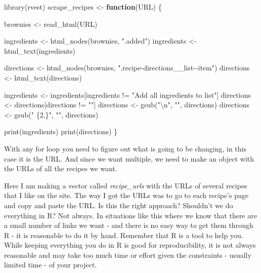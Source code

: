 \documentclass[
]{krantz}
\makeatletter
\newenvironment{Shaded}{\begin{snugshade}}{\end{snugshade}}
\newcommand{\ControlFlowTok}[1]{\textcolor[rgb]{0.27,0.27,0.27}{\textbf{#1}}}
\newcommand{\FunctionTok}[1]{\textcolor[rgb]{0,0,0}{#1}}
\newcommand{\NormalTok}[1]{#1}
\newcommand{\OtherTok}[1]{\textcolor[rgb]{0.37,0.37,0.37}{#1}}
\newcommand{\SpecialCharTok}[1]{\textcolor[rgb]{0,0,0}{#1}}
\newcommand{\StringTok}[1]{\textcolor[rgb]{0.5,0.5,0.5}{#1}}
\newenvironment{kframe}{%
\medskip{}
\setlength{\fboxsep}{.8em}
 \def\at@end@of@kframe{}%
 \ifinner\ifhmode%
  \def\at@end@of@kframe{\end{minipage}}%
  \begin{minipage}{\columnwidth}%
 \fi\fi%
 \def\FrameCommand##1{\hskip\@totalleftmargin \hskip-\fboxsep
 \colorbox{shadecolor}{##1}\hskip-\fboxsep
     \hskip-\linewidth \hskip-\@totalleftmargin \hskip\columnwidth}%
 \MakeFramed {\advance\hsize-\width
   \@totalleftmargin\z@ \linewidth\hsize
   \@setminipage}}%
 {\par\unskip\endMakeFramed%
 \at@end@of@kframe}
\renewenvironment{Shaded}{\begin{kframe}}{\end{kframe}}
\makeatother
\begin{document}
\begin{Shaded}
\begin{Highlighting}[]
\FunctionTok{library}\NormalTok{(rvest)}
\NormalTok{scrape\_recipes }\OtherTok{\textless{}{-}} \ControlFlowTok{function}\NormalTok{(URL) \{}
  
\NormalTok{  brownies }\OtherTok{\textless{}{-}} \FunctionTok{read\_html}\NormalTok{(URL)}
  
\NormalTok{  ingredients }\OtherTok{\textless{}{-}} \FunctionTok{html\_nodes}\NormalTok{(brownies, }\StringTok{".added"}\NormalTok{)}
\NormalTok{  ingredients }\OtherTok{\textless{}{-}} \FunctionTok{html\_text}\NormalTok{(ingredients)}
  
\NormalTok{  directions }\OtherTok{\textless{}{-}} \FunctionTok{html\_nodes}\NormalTok{(brownies, }\StringTok{".recipe{-}directions\_\_list{-}{-}item"}\NormalTok{)}
\NormalTok{  directions }\OtherTok{\textless{}{-}} \FunctionTok{html\_text}\NormalTok{(directions)}
  
\NormalTok{  ingredients }\OtherTok{\textless{}{-}}\NormalTok{ ingredients[ingredients }\SpecialCharTok{!=} \StringTok{"Add all ingredients to list"}\NormalTok{]}
\NormalTok{  directions  }\OtherTok{\textless{}{-}}\NormalTok{ directions[directions }\SpecialCharTok{!=} \StringTok{""}\NormalTok{]}
\NormalTok{  directions  }\OtherTok{\textless{}{-}} \FunctionTok{gsub}\NormalTok{(}\StringTok{"}\SpecialCharTok{\textbackslash{}n}\StringTok{"}\NormalTok{, }\StringTok{""}\NormalTok{, directions)}
\NormalTok{  directions  }\OtherTok{\textless{}{-}} \FunctionTok{gsub}\NormalTok{(}\StringTok{" \{2,\}"}\NormalTok{, }\StringTok{""}\NormalTok{, directions)}
  
  \FunctionTok{print}\NormalTok{(ingredients)}
  \FunctionTok{print}\NormalTok{(directions)}
\NormalTok{\}}
\end{Highlighting}
\end{Shaded}

With any for loop you need to figure out what is going to be changing, in this case it is the URL. And since we want multiple, we need to make an object with the URLs of all the recipes we want.

Here I am making a vector called \emph{recipe\_urls} with the URLs of several recipes that I like on the site. The way I got the URLs was to go to each recipe's page and copy and paste the URL. Is this the right approach? Shouldn't we do everything in R? Not always. In situations like this where we know that there are a small number of links we want - and there is no easy way to get them through R - it is reasonable to do it by hand. Remember that R is a tool to help you. While keeping everything you do in R is good for reproducibility, it is not always reasonable and may take too much time or effort given the constraints - usually limited time - of your project.
\end{document}
